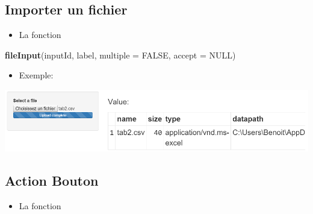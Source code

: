 \documentclass[
]{article}
\newenvironment{Shaded}{\begin{snugshade}}{\end{snugshade}}
\newcommand{\AttributeTok}[1]{\textcolor[rgb]{0.13,0.29,0.53}{#1}}
\newcommand{\CommentTok}[1]{\textcolor[rgb]{0.56,0.35,0.01}{\textit{#1}}}
\newcommand{\ConstantTok}[1]{\textcolor[rgb]{0.56,0.35,0.01}{#1}}
\newcommand{\FunctionTok}[1]{\textcolor[rgb]{0.13,0.29,0.53}{\textbf{#1}}}
\newcommand{\NormalTok}[1]{#1}
\newcommand{\StringTok}[1]{\textcolor[rgb]{0.31,0.60,0.02}{#1}}
\providecommand{\tightlist}{%
  \setlength{\itemsep}{0pt}\setlength{\parskip}{0pt}}
\begin{document}
\hypertarget{importer-un-fichier}{%
\subsection{Importer un fichier}\label{importer-un-fichier}}

\begin{itemize}
\tightlist
\item
  La fonction
\end{itemize}

\begin{Shaded}
\begin{Highlighting}[]
\FunctionTok{fileInput}\NormalTok{(inputId, label, }\AttributeTok{multiple =} \ConstantTok{FALSE}\NormalTok{, }\AttributeTok{accept =} \ConstantTok{NULL}\NormalTok{)}
\end{Highlighting}
\end{Shaded}

\begin{itemize}
\tightlist
\item
  Exemple:
\end{itemize}

\begin{Shaded}
\end{Shaded}

\includegraphics{img/file.png}

\hypertarget{action-bouton}{%
\subsection{Action Bouton}\label{action-bouton}}

\begin{itemize}
\tightlist
\item
  La fonction
\end{itemize}
\end{document}
